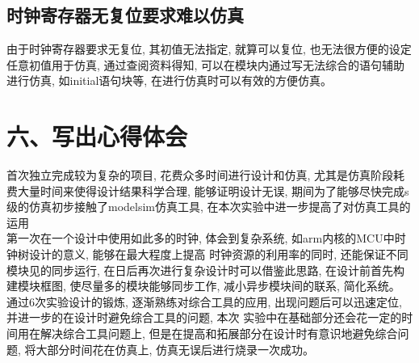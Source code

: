 \documentclass{article}
\newcommand{\fourhao}{\fontsize{14pt}{\baselineskip}\selectfont} %
\newcommand{\xiaosihao}{\fontsize{12pt}{\baselineskip}\selectfont} %
\begin{document}
\subsection*{时钟寄存器无复位要求难以仿真}
由于时钟寄存器要求无复位, 其初值无法指定, 就算可以复位, 也无法很方便的设定任意初值用于仿真, 通过查阅资料得知, 可以在模块内通过写无法综合的语句辅助进行仿真, 如initial语句块等, 在进行仿真时可以有效的方便仿真。
\section*{\fourhao 六、写出心得体会}
\xiaosihao
首次独立完成较为复杂的项目, 花费众多时间进行设计和仿真, 尤其是仿真阶段耗费大量时间来使得设计结果科学合理, 
能够证明设计无误, 期间为了能够尽快完成s级的仿真初步接触了modelsim仿真工具, 在本次实验中进一步提高了对仿真工具的运用\\
第一次在一个设计中使用如此多的时钟, 体会到复杂系统, 如arm内核的MCU中时钟树设计的意义, 能够在最大程度上提高
时钟资源的利用率的同时, 还能保证不同模块见的同步运行, 在日后再次进行复杂设计时可以借鉴此思路, 在设计前首先构建模块框图, 
使尽量多的模块能够同步工作, 减小异步模块间的联系, 简化系统。\\
通过6次实验设计的锻炼, 逐渐熟练对综合工具的应用, 出现问题后可以迅速定位, 并进一步的在设计时避免综合工具的问题, 本次
实验中在基础部分还会花一定的时间用在解决综合工具问题上, 但是在提高和拓展部分在设计时有意识地避免综合问题, 将大部分时间花在仿真上, 
仿真无误后进行烧录一次成功。\\
\end{document}
